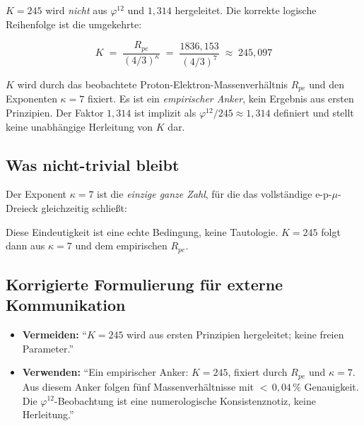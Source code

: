 $K = 245$ wird \emph{nicht} aus $\varphi^{12}$ und $1{,}314$ hergeleitet.
Die korrekte logische Reihenfolge ist die umgekehrte:

\begin{equation}
  K \;=\; \frac{R_{pe}}{(4/3)^\kappa}
    \;=\; \frac{1836{,}153}{(4/3)^7}
    \;\approx\; 245{,}097
  \tag{190.14}
\end{equation}

$K$ wird durch das beobachtete Proton-Elektron-Massenverhältnis $R_{pe}$
und den Exponenten $\kappa = 7$ fixiert. Es ist ein \emph{empirischer Anker},
kein Ergebnis aus ersten Prinzipien. Der Faktor $1{,}314$ ist implizit
als $\varphi^{12} / 245 \approx 1{,}314$ definiert und stellt keine
unabhängige Herleitung von $K$ dar.

\subsection*{Was nicht-trivial bleibt}

Der Exponent $\kappa = 7$ ist die \emph{einzige ganze Zahl}, für die das
vollständige e-p-$\mu$-Dreieck gleichzeitig schließt:
\begin{center}
{\footnotesize
{}
}
\end{center}
Diese Eindeutigkeit ist eine echte Bedingung, keine Tautologie.
$K = 245$ folgt dann aus $\kappa = 7$ und dem empirischen $R_{pe}$.

\subsection*{Korrigierte Formulierung für externe Kommunikation}

\begin{itemize}
  \item \textbf{Vermeiden:} \enquote{$K = 245$ wird aus ersten Prinzipien
        hergeleitet; keine freien Parameter.}
  \item \textbf{Verwenden:} \enquote{Ein empirischer Anker: $K = 245$,
        fixiert durch $R_{pe}$ und $\kappa = 7$. Aus diesem Anker
        folgen fünf Massenverhältnisse mit ${<}\,0{,}04\,\%$ Genauigkeit.
        Die $\varphi^{12}$-Beobachtung ist eine numerologische
        Konsistenznotiz, keine Herleitung.}
\end{itemize}

